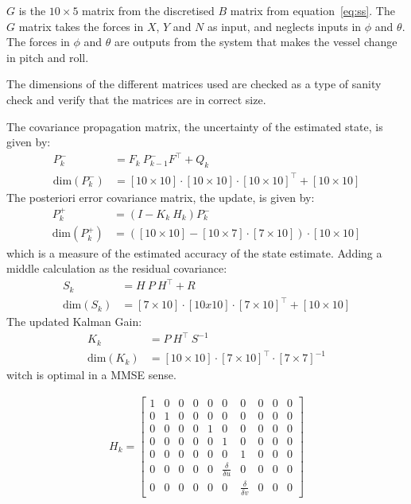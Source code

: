 $G$ is the $10 \times 5$ matrix from the discretised $B$ matrix from equation~\vref{eq:ss}.
The $G$ matrix takes the forces in $X$, $Y$ and $N$ as input, and neglects inputs in $\phi$ and $\theta$. The forces in $\phi$ and $\theta$ are outputs from the system that makes the vessel change in pitch and roll.

The dimensions of the different matrices used are checked as a type of sanity check and verify that the matrices are in correct size.

The covariance propagation matrix, the uncertainty of the estimated state, is given by:
\begin{align}
P_k^- &= F_k\ P_{k-1}^-F^\top + Q_k\\
\text{dim}(P_k^-) &= [10 \times 10]\cdot [10 \times 10]\cdot [10 \times 10]^\top + [10 \times 10]
\end{align}
The posteriori error covariance matrix, the update, is given by:
\begin{align}
P_k^+ &= (I - K_k\ H_k)P_k^-\\
\text{dim}(P_k^+) &= ([10 \times 10] - [10 \times 7]\cdot [7 \times 10])\cdot [10 \times 10]
\end{align}
which is a measure of the estimated accuracy of the state estimate. Adding a middle calculation as the residual covariance:
\begin{align}
S_k &= H\ P\ H^\top + R\\
\text{dim}(S_k) &= [7 \times 10]\cdot [10x10]\cdot [7 \times 10]^\top + [10 \times 10]
\end{align}
The updated Kalman Gain:
\begin{align}
K_k &= P\ H^\top\ S^{-1}\\
\text{dim}(K_k) &= [10 \times 10]\cdot [7 \times 10]^\top\cdot [7 \times 7]^{-1}
\end{align}
witch is optimal in a \ac{MMSE} sense.



\begin{align}
H_k =
\begin{bmatrix}
1 & 0 & 0 & 0 & 0 & 0 & 0 & 0 & 0 & 0 \\
0 & 1 & 0 & 0 & 0 & 0 & 0 & 0 & 0 & 0 \\
0 & 0 & 0 & 0 & 1 & 0 & 0 & 0 & 0 & 0 \\
0 & 0 & 0 & 0 & 0 & 1 & 0 & 0 & 0 & 0 \\
0 & 0 & 0 & 0 & 0 & 0 & 1 & 0 & 0 & 0 \\
0 & 0 & 0 & 0 & 0 & \frac{\delta}{\delta u} & 0 & 0 & 0 & 0 \\
0 & 0 & 0 & 0 & 0 & 0 & \frac{\delta}{\delta v} & 0 & 0 & 0
\end{bmatrix}
\end{align}

